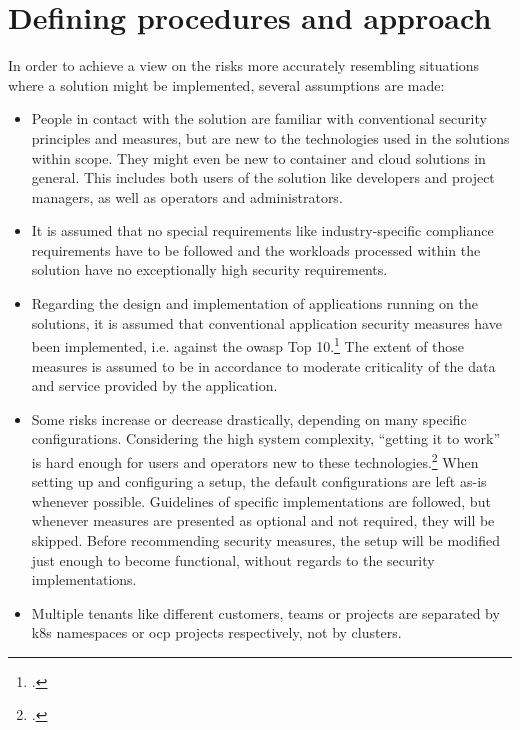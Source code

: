 \section{Defining procedures and approach}
In order to achieve a view on the risks more accurately resembling situations where a solution might be implemented, several assumptions are made:

\begin{itemize}

\item People in contact with the solution are familiar with conventional security principles and measures, but are new to the technologies used in the solutions within scope. They might even be new to container and cloud solutions in general. This includes both users of the solution like developers and project managers, as well as operators and administrators.

\item It is assumed that no special requirements like industry-specific compliance requirements have to be followed and the workloads processed within the solution have no exceptionally high security requirements. 

\item Regarding the design and implementation of applications running on the solutions, it is assumed that conventional application security measures have been implemented, i.e. against the \gls{owasp} Top 10.\footcite[][, p. 4]{topten} The extent of those measures is assumed to be in accordance to moderate criticality of the data and service provided by the application.

\item Some risks increase or decrease drastically, depending on many specific configurations. Considering the high system complexity, ``getting it to work'' is hard enough for users and operators new to these technologies.\footcite[][, starting at 3:05]{hackAndHarden} When setting up and configuring a setup, the default configurations are left as-is whenever possible. Guidelines of specific implementations are followed, but whenever measures are presented as optional and not required, they will be skipped. Before recommending security measures, the setup will be modified just enough to become functional, without regards to the security implementations.

\item Multiple tenants like different customers, teams or projects are separated by \gls{k8s} namespaces or \gls{ocp} projects respectively, not by clusters.

\end{itemize}


